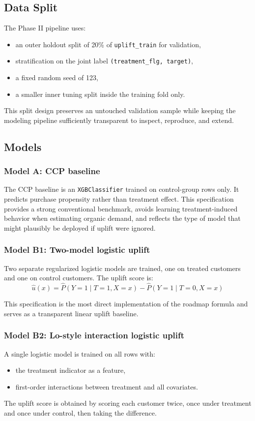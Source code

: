 \documentclass[11pt,a4paper]{article}
\begin{document}
\subsection{Data Split}
The Phase II pipeline uses:
\begin{itemize}
    \item an outer holdout split of 20\% of \texttt{uplift\_train} for validation,
    \item stratification on the joint label \texttt{(treatment\_flg, target)},
    \item a fixed random seed of 123,
    \item a smaller inner tuning split inside the training fold only.
\end{itemize}

This split design preserves an untouched validation sample while keeping the modeling pipeline sufficiently transparent to inspect, reproduce, and extend.

\subsection{Models}
\subsubsection{Model A: CCP baseline}
The CCP baseline is an \texttt{XGBClassifier} trained on control-group rows only. It predicts purchase propensity rather than treatment effect. This specification provides a strong conventional benchmark, avoids learning treatment-induced behavior when estimating organic demand, and reflects the type of model that might plausibly be deployed if uplift were ignored.

\subsubsection{Model B1: Two-model logistic uplift}
Two separate regularized logistic models are trained, one on treated customers and one on control customers. The uplift score is:
\[
\hat{u}(x) = \hat{P}(Y=1 \mid T=1, X=x) - \hat{P}(Y=1 \mid T=0, X=x)
\]

This specification is the most direct implementation of the roadmap formula and serves as a transparent linear uplift baseline.

\subsubsection{Model B2: Lo-style interaction logistic uplift}
A single logistic model is trained on all rows with:
\begin{itemize}
    \item the treatment indicator as a feature,
    \item first-order interactions between treatment and all covariates.
\end{itemize}
The uplift score is obtained by scoring each customer twice, once under treatment and once under control, then taking the difference.
\end{document}
